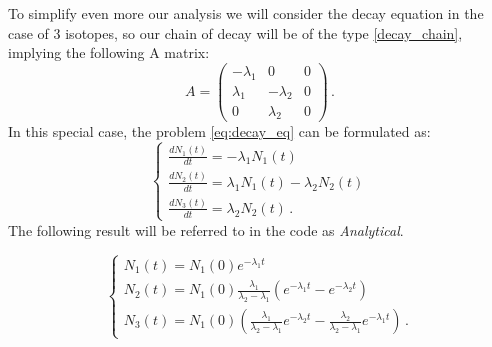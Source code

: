 To simplify even more our analysis we will consider the decay equation in the case of 3 isotopes, so our chain of decay will be of the type \ref{decay_chain}, implying the following A matrix:
\begin{equation}\label{eq:A_matrix}
    A = \begin{pmatrix}
            -\lambda_1 & 0 & 0\\
            \lambda_1 & -\lambda_2 & 0\\
            0 & \lambda_2 & 0
        \end{pmatrix} \,.
\end{equation}
In this special case, the problem \ref{eq:decay_eq} can be formulated as:
\begin{equation}
    \begin{cases}
        \frac{dN_1(t)}{dt} = -\lambda_1 N_1(t)\\
        \frac{dN_2(t)}{dt} = \lambda_1 N_1(t) -\lambda_2 N_2(t)\\
        \frac{dN_3(t)}{dt} = \lambda_2 N_2(t)\,.
    \end{cases}
\end{equation}
The following result will be referred to in the code as \textit{Analytical}.

\begin{equation}\label{eq:analytical_sol}
    \begin{cases}
        N_1(t) = N_1(0)e^{-\lambda_1 t}\\
        N_2(t) = N_1(0) \frac{\lambda_1}{\lambda_2 - \lambda_1} (e^{-\lambda_1 t} - e^{-\lambda_2 t})\\
        N_3(t) = N_1(0) (\frac{\lambda_1}{\lambda_2 - \lambda_1}e^{-\lambda_2 t} - \frac{\lambda_2}{\lambda_2 - \lambda_1}e^{-\lambda_1 t} )\,.
    \end{cases}
\end{equation}